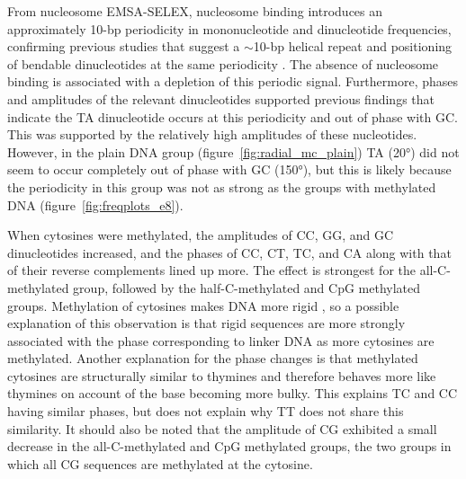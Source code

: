 \documentclass[parskip=full, numbers=noenddot]{scrreprt}
\begin{document}
From nucleosome EMSA-SELEX, nucleosome binding introduces an approximately 10-bp periodicity in mononucleotide and dinucleotide frequencies, confirming previous studies that suggest a $\sim$10-bp helical repeat and positioning of bendable dinucleotides at the same periodicity \citep{struhl_determinants_2013}.  The absence of nucleosome binding is associated with a depletion of this periodic signal.  Furthermore, phases and amplitudes of the relevant dinucleotides supported previous findings that indicate the TA dinucleotide occurs at this periodicity and out of phase with GC.  This was supported by the relatively high amplitudes of these nucleotides.  However, in the plain DNA group (figure~\ref{fig:radial_mc_plain}) TA (\ang{20}) did not seem to occur completely out of phase with GC (\ang{150}), but this is likely because the periodicity in this group was not as strong as the groups with methylated DNA (figure~\ref{fig:freqplots_e8}).  %


When cytosines were methylated, the amplitudes of CC, GG, and GC dinucleotides increased, and the phases of CC, CT, TC, and CA along with that of their reverse complements lined up more.  The effect is strongest for the all-C-methylated group, followed by the half-C-methylated and CpG methylated groups.  Methylation of cytosines makes DNA more rigid \citep{rao_systematic_2018, perez_impact_2012}, so a possible explanation of this observation is that rigid sequences are more strongly associated with the phase corresponding to linker DNA as more cytosines are methylated.  Another explanation for the phase changes is that methylated cytosines are structurally similar to thymines and therefore behaves more like thymines on account of the base becoming more bulky.  This explains TC and CC having similar phases, but does not explain why TT does not share this similarity.  It should also be noted that the amplitude of CG exhibited a small decrease in the all-C-methylated and CpG methylated groups, the two groups in which all CG sequences are methylated at the cytosine.  %
\end{document}
